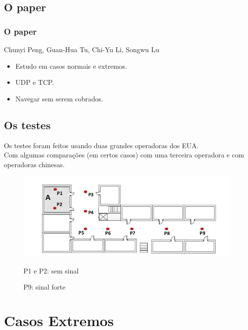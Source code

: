 \documentclass[brazil]{beamer}
\begin{document}
\subsection{O paper}
\begin{frame}[fragile]
    \frametitle{O paper}
    \begin{center}
        Chunyi Peng, Guan-Hua Tu, Chi-Yu Li, Songwu Lu
    \end{center}
    \vspace{0.4cm}
    \begin{itemize}
        \item Estudo em casos normais e extremos.
        \item UDP e TCP.
        \item Navegar sem serem cobrados.

    \end{itemize}
\end{frame}

\subsection{Os testes}
\begin{frame}[fragile]
    Os testes foram feitos usando duas grandes operadoras dos EUA. \\
    Com algumas comparações (em certos casos) com uma terceira operadora e com operadoras chinesas.
\end{frame}

\begin{frame}
    \begin{figure}
    \begin{center}
        \includegraphics[scale=0.3]{images/sala.jpg}
    \end{center}
    P1 e P2: sem sinal

    P9: sinal forte
    \end{figure}
\end{frame}

\section{Casos Extremos}
\end{document}
